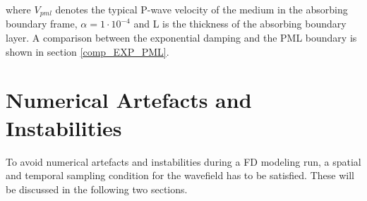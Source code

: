 \documentclass[11pt,onecolumn,oneside]{article}
\begin{document}
\begin{enumerate}

where $V_{pml}$ denotes the typical P-wave velocity of the medium in the absorbing boundary frame, $\alpha=1 \cdot 10^{-4}$ and L is the thickness of the absorbing boundary layer.
A comparison between the exponential damping and the PML boundary is shown in section \ref{comp_EXP_PML}.   
\end{enumerate} 
\clearpage

\section{Numerical Artefacts and Instabilities}\label{num_instab}
To avoid numerical artefacts and instabilities during a FD modeling run, a spatial and temporal sampling condition for the wavefield has to be satisfied. These will be discussed in the following two sections. 
\end{document}
